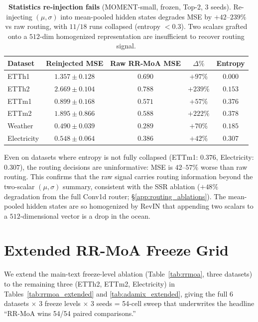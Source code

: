 \documentclass{article}
\begin{document}
\begin{table}[!htbp]
\centering
\caption{\textbf{Statistics re-injection fails} (MOMENT-small, frozen, Top-2, 3 seeds). Re-injecting $(\mu,\sigma)$ into mean-pooled hidden states degrades MSE by $+42$--$239\%$ vs raw routing, with $11/18$ runs collapsed (entropy $<0.3$). Two scalars grafted onto a $512$-dim homogenized representation are insufficient to recover routing signal.}
\label{tab:reinjection}
\small
\begin{tabular}{@{}lcccc@{}}
\toprule
Dataset & Reinjected MSE & Raw RR-MoA MSE & $\Delta\%$ & Entropy \\
\midrule
ETTh1       & $1.357 \pm 0.128$ & $0.690$ & $+97\%$  & $0.000$ \\
ETTh2       & $2.669 \pm 0.104$ & $0.788$ & $+239\%$ & $0.153$ \\
ETTm1       & $0.899 \pm 0.168$ & $0.571$ & $+57\%$  & $0.376$ \\
ETTm2       & $1.895 \pm 0.866$ & $0.588$ & $+222\%$ & $0.378$ \\
Weather     & $0.490 \pm 0.039$ & $0.289$ & $+70\%$  & $0.185$ \\
Electricity & $0.548 \pm 0.064$ & $0.386$ & $+42\%$  & $0.307$ \\
\bottomrule
\end{tabular}
\end{table}

Even on datasets where entropy is not fully collapsed (ETTm1: $0.376$, Electricity: $0.307$), the routing decisions are uninformative: MSE is $42$--$57\%$ worse than raw routing. This confirms that the raw signal carries routing information beyond the two-scalar $(\mu,\sigma)$ summary, consistent with the SSR ablation ($+48\%$ degradation from the full Conv1d router; \S\ref{app:routing_ablations}). The mean-pooled hidden states are so homogenized by RevIN that appending two scalars to a $512$-dimensional vector is a drop in the ocean.

\section{Extended RR-MoA Freeze Grid}
\label{app:extended_rrmoa}

We extend the main-text freeze-level ablation (Table~\ref{tab:rrmoa}, three datasets) to the remaining three (ETTh2, ETTm2, Electricity) in Tables~\ref{tab:rrmoa_extended} and \ref{tab:adamix_extended}, giving the full 6 datasets $\times$ 3 freeze levels $\times$ 3 seeds = 54-cell sweep that underwrites the headline ``RR-MoA wins 54/54 paired comparisons.''
\end{document}

